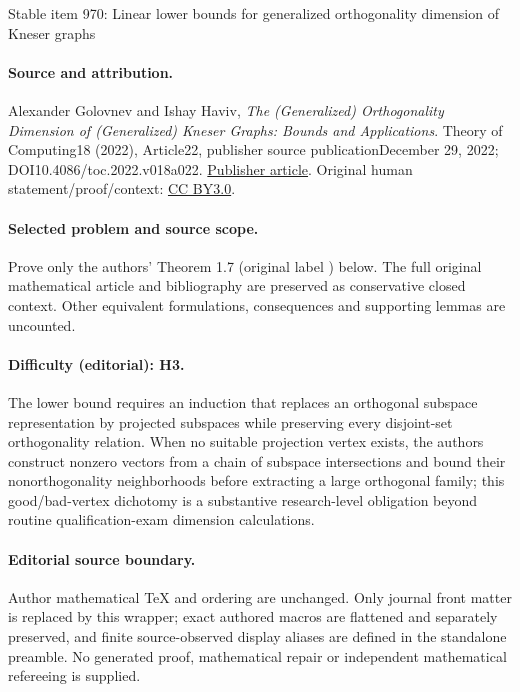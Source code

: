 \documentclass[11pt]{article}
\numberwithin{equation}{section}
\theoremstyle{definition}
\theoremstyle{plain}
\begin{document}
\begin{center}{\Large Stable item 970: Linear lower bounds for generalized orthogonality dimension of Kneser graphs}\end{center}
\paragraph{Source and attribution.}
Alexander Golovnev and Ishay Haviv, \emph{The (Generalized) Orthogonality Dimension of (Generalized) Kneser Graphs: Bounds and Applications}. Theory of Computing18 (2022), Article22, publisher source publicationDecember 29, 2022; DOI10.4086/toc.2022.v018a022. \href{https://theoryofcomputing.org/articles/v018a022/}{Publisher article}. Original human statement/proof/context: \href{https://creativecommons.org/licenses/by/3.0/}{CC BY3.0}.
\paragraph{Selected problem and source scope.}
Prove only the authors' Theorem 1.7 (original label ) below. The full original mathematical article and bibliography are preserved as conservative closed context. Other equivalent formulations, consequences and supporting lemmas are uncounted.
\paragraph{Difficulty (editorial): H3.}
The lower bound requires an induction that replaces an orthogonal subspace representation by projected subspaces while preserving every disjoint-set orthogonality relation. When no suitable projection vertex exists, the authors construct nonzero vectors from a chain of subspace intersections and bound their nonorthogonality neighborhoods before extracting a large orthogonal family; this good/bad-vertex dichotomy is a substantive research-level obligation beyond routine qualification-exam dimension calculations.
\paragraph{Editorial source boundary.}
Author mathematical TeX and ordering are unchanged. Only journal front matter is replaced by this wrapper; exact authored macros are flattened and separately preserved, and finite source-observed display aliases are defined in the standalone preamble. No generated proof, mathematical repair or independent mathematical refereeing is supplied. 
\clearpage
\end{document}
